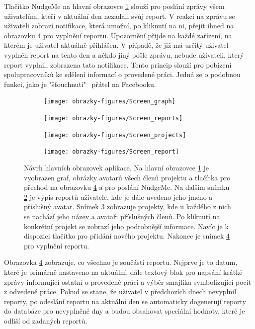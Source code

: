 Tlačítko NudgeMe na hlavní obrazovce \ref{fig:hlavni} slouží pro poslání zprávy všem uživatelům, kteří v aktuální den nezadali svůj report. V reakci na zprávu se uživateli zobrazí notifikace, která umožní, po kliknutí na ni, přejít ihned na obrazovku \ref{fig:report} pro vyplnění reportu. Upozornění přijde na každé zařízení, na kterém je uživatel aktuálně přihlášen. V případě, že již má určitý uživatel vyplněn report na tento den a někdo jiný pošle zprávu, nebude uživateli, který report vyplnil, zobrazena tato notifikace. Tento princip slouží pro pobízení spolupracovníků ke sdělení informací o provedené práci. Jedná se o podobnou funkci, jako je "šťouchnutí"~ přátel na Facebooku.

\begin{figure}[H]
    \centering
    \begin{subfigure}[b]{0.2\textwidth}
        \texttt{[image: obrazky-figures/Screen\_graph]}
        \caption{}
        \label{fig:hlavni}
    \end{subfigure}
    \begin{subfigure}[b]{0.2\textwidth}
        \texttt{[image: obrazky-figures/Screen\_reports]}
        \caption{}
        \label{fig:reporty}
    \end{subfigure}
    \begin{subfigure}[b]{0.2\textwidth}
        \texttt{[image: obrazky-figures/Screen\_projects]}
        \caption{}
        \label{fig:projekty}
    \end{subfigure}
    \begin{subfigure}[b]{0.2\textwidth}
        \texttt{[image: obrazky-figures/Screen\_report]}
        \caption{}
        \label{fig:report}
    \end{subfigure}
    \caption{Návrh hlavních obrazovek aplikace. Na hlavní obrazovce \ref{fig:hlavni} je vyobrazen graf, obrázky avatarů všech členů projektu a tlačítka pro přechod na obrazovku \ref{fig:report} a pro poslání NudgeMe. Na dalším snímku \ref{fig:reporty} je výpis reportů uživatele, kde je dále uvedeno jeho jméno a příslušný avatar. Snímek \ref{fig:projekty} zobrazuje projekty, kde u každého z nich se nachází jeho název a avataři příslušných členů. Po kliknutí na konkrétní projekt se zobrazí jeho podrobnější informace. Navíc je k dispozici tlačítko pro přidání nového projektu. Nakonec je snímek \ref{fig:report} pro vyplnění reportu.}
    \label{fig:dulezite}
\end{figure}

Obrazovka \ref{fig:report} zobrazuje, co všechno je součástí reportu. Nejprve je to datum, které je primárně nastaveno na aktuální, dále textový blok pro napsání krátké zprávy informující ostatní o provedené práci a výběr smajlíka symbolizující pocit z odvedené práce. Pokud se stane, že uživatel v předchozích dnech nevyplnil reporty, po odeslání reportu na aktuální den se automaticky dogenerují reporty do databáze pro nevyplněné dny a budou obsahovat speciální hodnoty, které je odliší od zadaných reportů. 
 
